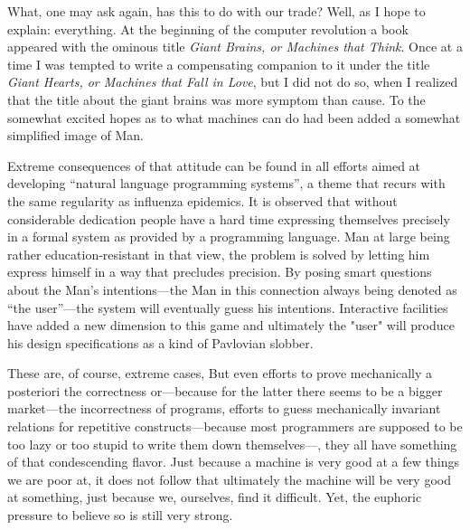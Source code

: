 \documentclass[12pt,letterpaper]{article}
\begin{document}
What, one may ask again, has this to do with 
our trade? Well, as I hope to explain: everything. 
At the beginning of the computer revolution a book 
appeared with the ominous title \textsl{Giant Brains, or 
Machines that Think}. Once at a time I was tempted 
to write a compensating companion to it under the 
title \textsl{Giant Hearts, or Machines that Fall in Love}, 
but I did not do so, when I realized that the title 
about the giant brains was more symptom than cause. 
To the somewhat excited hopes as to what machines 
can do had been added a somewhat simplified image 
of Man. 

Extreme consequences of that attitude can be found in all efforts aimed at
developing ``natural language programming systems'', a theme that recurs with
the same regularity as influenza epidemics. It is observed that without
considerable dedication people have a hard time expressing themselves precisely
in a formal system as provided by a programming language. Man at large being
rather education-resistant in that view, the problem is solved by letting him
express himself in a way that precludes precision. By posing smart questions
about the Man's intentions---the Man in this connection always being denoted as
``the user''---the system will eventually guess his intentions. Interactive
facilities have added a new dimension to this game and ultimately the "user"
will produce his design specifications as a kind of Pavlovian slobber. 

These are, of course, extreme cases, But even efforts to prove mechanically a
posteriori the correctness or---because for the latter there seems to be a
bigger market---the incorrectness of programs, efforts to guess mechanically
invariant relations for repetitive constructs---because most programmers are
supposed to be too lazy or too stupid to write them down themselves---, they
all have something of that condescending flavor. Just because a machine is
very good at a few things we are poor at, it does not follow that ultimately
the machine will be very good at something, just because we, ourselves, find it
difficult. Yet, the euphoric pressure to believe so is still very strong. 
\end{document}
